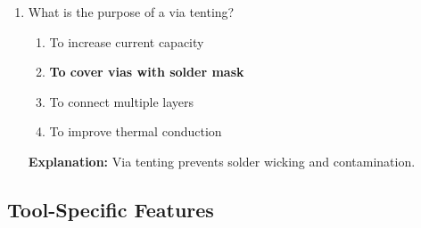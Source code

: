 \documentclass{article}
\begin{document}
\begin{enumerate}[resume]
		\item What is the purpose of a via tenting?
		\begin{enumerate}
			\item To increase current capacity
			\item \textbf{To cover vias with solder mask}
			\item To connect multiple layers
			\item To improve thermal conduction
		\end{enumerate}
		\textbf{Explanation:} Via tenting prevents solder wicking and contamination.
	\end{enumerate}
	
	\subsection*{Tool-Specific Features}
	
\end{document}
